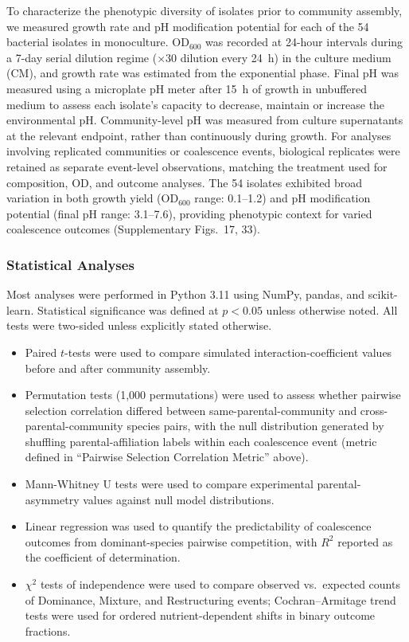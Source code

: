 To characterize the phenotypic diversity of isolates prior to community assembly, we measured growth rate and pH modification potential for each of the 54 bacterial isolates in monoculture. OD$_{600}$ was recorded at 24-hour intervals during a 7-day serial dilution regime ($\times$30 dilution every 24~h) in the culture medium (CM), and growth rate was estimated from the exponential phase. Final pH was measured using a microplate pH meter after 15~h of growth in unbuffered medium to assess each isolate's capacity to decrease, maintain or increase the environmental pH. Community-level pH was measured from culture supernatants at the relevant endpoint, rather than continuously during growth. For analyses involving replicated communities or coalescence events, biological replicates were retained as separate event-level observations, matching the treatment used for composition, OD, and outcome analyses. The 54 isolates exhibited broad variation in both growth yield (OD$_{600}$ range: 0.1--1.2) and pH modification potential (final pH range: 3.1--7.6), providing phenotypic context for varied coalescence outcomes (Supplementary Figs.~17, 33).


\subsubsection*{Statistical Analyses}
\label{sec:suppl:statistics}

Most analyses were performed in Python 3.11 using NumPy, pandas, and scikit-learn. Statistical significance was defined at $p < 0.05$ unless otherwise noted. All tests were two-sided unless explicitly stated otherwise.

\begin{itemize}
    \item Paired $t$-tests were used to compare simulated interaction-coefficient values before and after community assembly.
    \item Permutation tests (1,000 permutations) were used to assess whether pairwise selection correlation differed between same-parental-community and cross-parental-community species pairs, with the null distribution generated by shuffling parental-affiliation labels within each coalescence event (metric defined in ``Pairwise Selection Correlation Metric'' above).
    \item Mann-Whitney U tests were used to compare experimental parental-asymmetry values against null model distributions.
    \item Linear regression was used to quantify the predictability of coalescence outcomes from dominant-species pairwise competition, with $R^2$ reported as the coefficient of determination.
    \item $\chi^2$ tests of independence were used to compare observed vs.\ expected counts of Dominance, Mixture, and Restructuring events; Cochran--Armitage trend tests were used for ordered nutrient-dependent shifts in binary outcome fractions.
\end{itemize}
